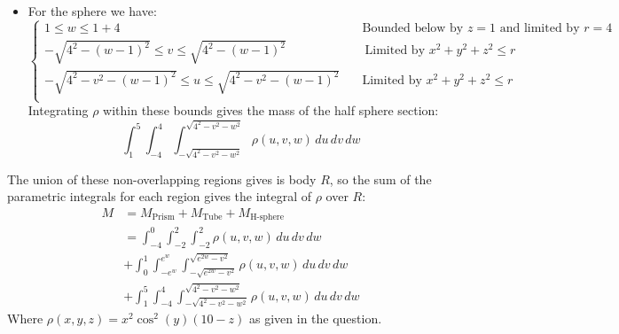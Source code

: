 \documentclass[a4paper, 11pt]{article}
\begin{document}
\begin{enumerate}[label=(\alph*)]
\begin{itemize}
		      \item For the sphere we have:
		            \[
			            \begin{cases}
				            1\leq w \leq 1+4                                          & \quad\text{Bounded below by $z=1$ and limited by $r=4$ } \\
				            -\sqrt{4^2-(w-1)^2}\leq v \leq \sqrt{4^2-(w-1)^2}         & \ \quad\text{Limited by $x^2+y^2+z^2\leq r$}             \\
				            -\sqrt{4^2-v^2-(w-1)^2}\leq u \leq \sqrt{4^2-v^2-(w-1)^2} & \quad\text{Limited by $x^2+y^2+z^2\leq r$}               \\
			            \end{cases}
		            \]
		            Integrating $\rho$ within these bounds gives the mass of the half sphere section:
		            \[
			            \int_{1}^5\int_{-4}^4\int_{-\sqrt{4^2-v^2-w^2}}^{\sqrt{4^2-v^2-w^2}}\rho(u,v,w) \,d u\,d v\,d w
		            \]
	      \end{itemize}
	      The union of these non-overlapping regions gives is body $R$, so the sum of the parametric integrals for each region gives the integral of $\rho$ over $R$:
	      \begin{align*}
		      M & = M_\text{Prism} + M_\text{Tube} + M_\text{H-sphere}                                                 \\
		        & =\int_{-4}^0\int_{-2}^2\int_{-2}^2\rho(u,v,w)\,d u \,d v \,d w                                       \\
		        & + \int_0^1\int_{-e^w}^{e^w}\int_{-\sqrt{e^{2w}-v^2}}^{\sqrt{e^{2w}-v^2}}\rho(u,v,w)\,d u \,d v \,d w \\
		        & + \int_{1}^5\int_{-4}^4\int_{-\sqrt{4^2-v^2-w^2}}^{\sqrt{4^2-v^2-w^2}}\rho(u,v,w) \,d u\,d v\,d w
	      \end{align*}
	      Where $\rho\left(x,y,z\right)=x^{2}\cos^{2}\left(y\right)\left(10-z\right)$ as given in the question.
\end{enumerate}

\pagebreak
\end{document}
